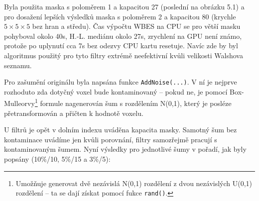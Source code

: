     Byla použita maska s poloměrem 1 a kapacitou 27 (poslední na obrázku 5.1) a pro dosažení lepších výsledků maska s poloměrem 2 a kapacitou 80 (krychle $5\times 5\times 5$ bez hran a středu). Čas výpočtu WBES na CPU se pro větší masku pohyboval okolo 40s, H.-L. mediánu okolo 27s, zrychlení na GPU není známo, protože po uplynutí cca 7s bez odezvy CPU kartu resetuje. Navíc zde by byl algoritmus použitý pro tyto filtry extrémě neefektivní kvůli velikosti Walshova seznamu.

    Pro zašumění originálu byla napsána funkce {\tt AddNoise(...)}. V ní je nejprve rozhoduto zda dotyčný voxel bude kontaminovaný -- pokud ne, je pomocí Box-Mulleorvy\footnote{Umožňuje generovat dvě nezávislá N(0,1) rozdělení z dvou nezávislých U(0,1) rozdělení -- ta se dají získat pomocí fukce {\tt rand()}.} formule nagenerován šum s rozdělením N(0,1), který je posléze přetransformován a přičten k hodnotě voxelu.

    U filtrů je opět v dolním indexu uváděna kapacita masky. Samotný šum bez kontaminace uvádíme jen kvůli porovnání, filtry samozřejmě pracují s kontaminovaným šumem. Nyní výsledky pro jednotlivé šumy v pořadí, jak byly popsány (10\%/10, 5\%/15 a 3\%/5):

